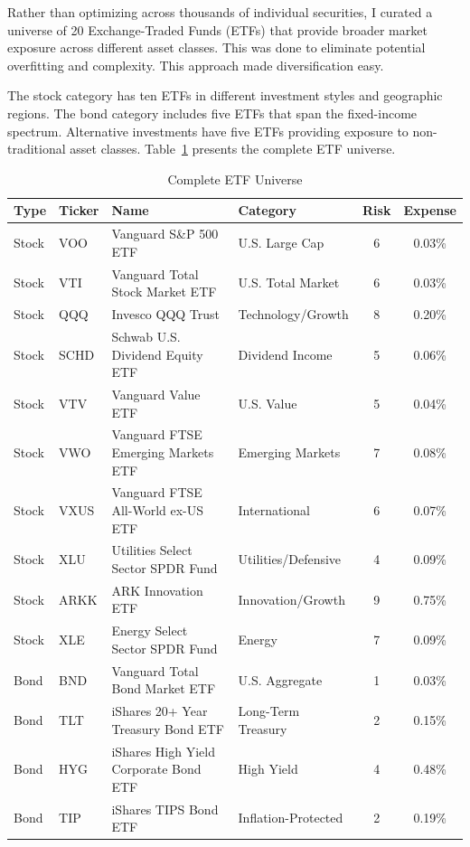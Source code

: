 \documentclass[11pt]{article}
\begin{document}
Rather than optimizing across thousands of individual securities, I curated a universe of 20 Exchange-Traded Funds (ETFs) that provide broader market exposure across different asset classes. This was done to eliminate potential overfitting and complexity. This approach made diversification easy.

The stock category has ten ETFs in different investment styles and geographic regions. The bond category includes five ETFs that span the fixed-income spectrum. Alternative investments have five ETFs providing exposure to non-traditional asset classes. Table~\ref{tab:etf-universe} presents the complete ETF universe.

\begin{table}[H]
\centering
\caption{Complete ETF Universe}
\label{tab:etf-universe}
\small
\begin{tabular}{llllcc}
\toprule
\textbf{Type} & \textbf{Ticker} & \textbf{Name} & \textbf{Category} & \textbf{Risk} & \textbf{Expense} \\
\midrule
Stock & VOO & Vanguard S\&P 500 ETF & U.S. Large Cap & 6 & 0.03\% \\
Stock & VTI & Vanguard Total Stock Market ETF & U.S. Total Market & 6 & 0.03\% \\
Stock & QQQ & Invesco QQQ Trust & Technology/Growth & 8 & 0.20\% \\
Stock & SCHD & Schwab U.S. Dividend Equity ETF & Dividend Income & 5 & 0.06\% \\
Stock & VTV & Vanguard Value ETF & U.S. Value & 5 & 0.04\% \\
Stock & VWO & Vanguard FTSE Emerging Markets ETF & Emerging Markets & 7 & 0.08\% \\
Stock & VXUS & Vanguard FTSE All-World ex-US ETF & International & 6 & 0.07\% \\
Stock & XLU & Utilities Select Sector SPDR Fund & Utilities/Defensive & 4 & 0.09\% \\
Stock & ARKK & ARK Innovation ETF & Innovation/Growth & 9 & 0.75\% \\
Stock & XLE & Energy Select Sector SPDR Fund & Energy & 7 & 0.09\% \\
\midrule
Bond & BND & Vanguard Total Bond Market ETF & U.S. Aggregate & 1 & 0.03\% \\
Bond & TLT & iShares 20+ Year Treasury Bond ETF & Long-Term Treasury & 2 & 0.15\% \\
Bond & HYG & iShares High Yield Corporate Bond ETF & High Yield & 4 & 0.48\% \\
Bond & TIP & iShares TIPS Bond ETF & Inflation-Protected & 2 & 0.19\% \\

\end{tabular}
\end{table}
\end{document}
